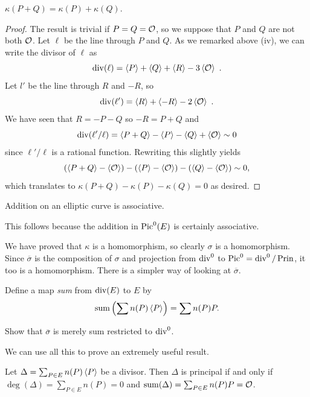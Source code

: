 \begin{prop}
\label{p6.3}
$\kappa(P+Q)=\kappa(P)+\kappa(Q)$.
\end{prop}

\begin{proof} The result is trivial if $P=Q=\mathcal{O}$, so we suppose that $P$ and $Q$ are not both $\mathcal{O}$. Let $\ell$ be the line through $P$ and $Q$. As we remarked above (iv), we can write the divisor of $\ell$ as
$$
\on{div}(\ell)=\divisor{P}+\divisor{Q}+\divisor{R}-3\divisor{\cuz}\ .
$$
Let $l'$ be the line through $R$ and $-R$, so
$$
\on{div}(\ell')=\divisor{R}+\divisor{-R}-2\divisor{\cuz}\ .
$$
We have seen that $R=-P-Q$ so $-R=P+Q$ and
$$
\operatorname{div}(\ell'/\ell)=\left\langle P+Q \right \rangle-\left\langle P \right \rangle-\left\langle Q \right \rangle+\left\langle \mathcal{O} \right \rangle\sim 0
$$
since $\ell'/\ell$ is a rational function. Rewriting this slightly yields
$$
(\left\langle P+Q \right \rangle-\left\langle \mathcal{O} \right \rangle)-(\left\langle P \right \rangle-\left\langle \mathcal{O} \right \rangle)-(\left\langle Q \right \rangle-\left\langle \mathcal{O} \right \rangle)\sim 0,
$$
which translates to $\kappa(P+Q)-\kappa(P)-\kappa(Q)=0$ as desired.
\end{proof}

\begin{coro}
\label{c6.4}
Addition on an elliptic curve is associative.
\end{coro}

This follows because the addition in $\operatorname{Pic}^{0}(E)$ is certainly associative.

We have proved that $\kappa$ is a homomorphism, so clearly $\sigma$ is a homomorphism. Since $\overline{\sigma}$ is the composition of $\sigma$ and projection from $\operatorname{div}^{0}$ to $\operatorname{Pic}^{0}=\operatorname{div}^{0}/\operatorname{Prin}$, it too is a homomorphism. There is a simpler way of looking at $\overline{\sigma}$.

\begin{defi}
\label{d6.5}
Define a map {\it sum} from $\operatorname{div}(E)$ to $E$ by
\[\operatorname{sum}\left(\displaystyle \sum n(P)\left\langle P \right \rangle\right)=\sum n(P)P .\]
\end{defi}

\begin{exo}
\label{e6.6}
Show that $\overline{\sigma}$ is merely sum restricted to $\operatorname{div}^0$.
\end{exo}

We can use all this to prove an extremely useful result.

\begin{prop}
\label{p6.7}
Let $\Delta=\sum_{P\in E}n(P)\left\langle P \right \rangle$ be a divisor. Then $\Delta$ is principal if and only if $\deg(\Delta)=\sum_{P\in E}n(P)=0$ and $\operatorname{sum}(\Delta)=\sum_{P\in E}n(P)P=\mathcal{O}$.
\end{prop}


